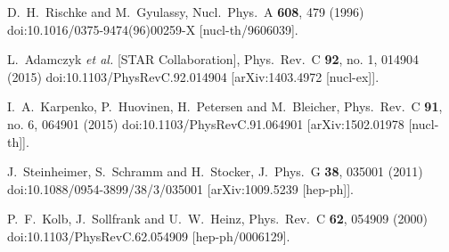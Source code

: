 \documentclass[a4paper]{panl}
\begin{document}
\begin{thebibliography}{1}
\def\selectlanguageifdefined#1{
\expandafter\ifx\csname date#1\endcsname\relax
\else\selectlanguage{#1}\fi}
\providecommand*{\href}[2]{{\small #2}}
\providecommand*{\url}[1]{{\small #1}}
\providecommand*{\BibUrl}[1]{\url{#1}}
\providecommand{\BibAnnote}[1]{}
\providecommand*{\BibEmph}[1]{\emph{#1}}
\providecommand*{\BibDash}{\ifdim\lastskip>0pt\unskip\nobreak\hskip.2em\fi
  \cyrdash\hskip.2em\ignorespaces}

  D.~H.~Rischke and M.~Gyulassy,
  Nucl.\ Phys.\ A {\bf 608}, 479 (1996)
  doi:10.1016/0375-9474(96)00259-X
  [nucl-th/9606039].

  L.~Adamczyk {\it et al.} [STAR Collaboration],
  Phys.\ Rev.\ C {\bf 92}, no. 1, 014904 (2015)
  doi:10.1103/PhysRevC.92.014904
  [arXiv:1403.4972 [nucl-ex]].

  I.~A.~Karpenko, P.~Huovinen, H.~Petersen and M.~Bleicher,
  Phys.\ Rev.\ C {\bf 91}, no. 6, 064901 (2015)
  doi:10.1103/PhysRevC.91.064901
  [arXiv:1502.01978 [nucl-th]].

  J.~Steinheimer, S.~Schramm and H.~Stocker,
  J.\ Phys.\ G {\bf 38}, 035001 (2011)
  doi:10.1088/0954-3899/38/3/035001
  [arXiv:1009.5239 [hep-ph]].

  P.~F.~Kolb, J.~Sollfrank and U.~W.~Heinz,
  Phys.\ Rev.\ C {\bf 62}, 054909 (2000)
  doi:10.1103/PhysRevC.62.054909
  [hep-ph/0006129].


\end{thebibliography}
\end{document}
